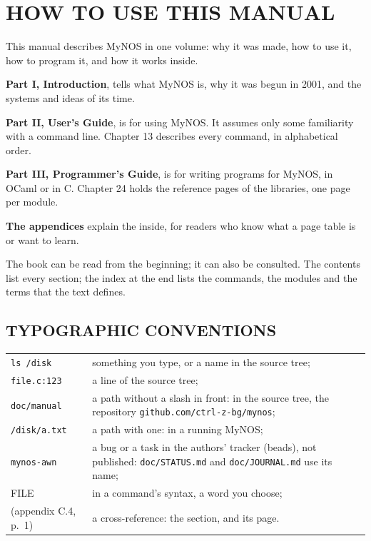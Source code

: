 \chapter*{HOW TO USE THIS MANUAL}

This manual describes MyNOS in one volume: why it was made, how to use
it, how to program it, and how it works inside.

\textbf{Part I, Introduction}, tells what MyNOS is, why it was begun in
2001, and the systems and ideas of its time.

\textbf{Part II, User's Guide}, is for using MyNOS. It assumes only some
familiarity with a command line. Chapter 13 describes every command, in
alphabetical order.

\textbf{Part III, Programmer's Guide}, is for writing programs for MyNOS,
in OCaml or in C. Chapter 24 holds the reference pages of the libraries,
one page per module.

\textbf{The appendices} explain the inside, for readers who know what a
page table is or want to learn.

The book can be read from the beginning; it can also be consulted. The
contents list every section; the index at the end lists the commands,
the modules and the terms that the text defines.

\section*{TYPOGRAPHIC CONVENTIONS}

\begin{tabular}{@{}p{33mm}@{}p{\dimexpr\linewidth-33mm}@{}}
\texttt{ls /disk} & something you type, or a name in the source tree;\\
\texttt{file.c:123} & a line of the source tree;\\
\texttt{doc/manual} & a path without a slash in front: in the source
tree, the repository \texttt{github.com/ctrl-z-bg/mynos};\\
\texttt{/disk/a.txt} & a path with one: in a running MyNOS;\\
\texttt{mynos-awn} & a bug or a task in the authors' tracker (beads), not
published: \texttt{doc/STATUS.md} and \texttt{doc/JOURNAL.md} use its name;\\
FILE & in a command's syntax, a word you choose;\\
(appendix C.4, p.~1) & a cross-reference: the section, and its page.\\
\end{tabular}

